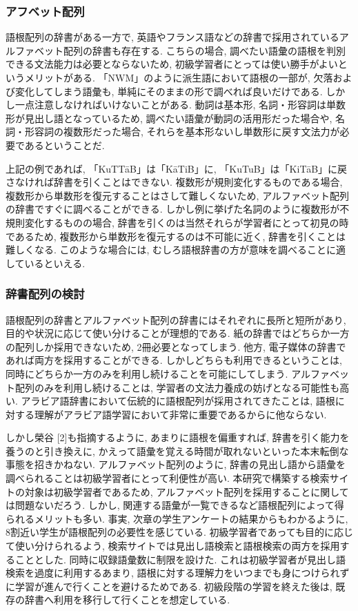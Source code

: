 \documentclass[technicalreport]{ieicej}
\begin{document}
\subsubsection{アフベット配列}
語根配列の辞書がある一方で, 英語やフランス語などの辞書で採用されているアルファベット配列の辞書も存在する. こちらの場合, 調べたい語彙の語根を判別できる文法能力は必要とならないため, 初級学習者にとっては使い勝手がよいというメリットがある. 「NWM」のように派生語において語根の一部が, 欠落および変化してしまう語彙も, 単純にそのままの形で調べれば良いだけである. しかし一点注意しなければいけないことがある. 動詞は基本形, 名詞・形容詞は単数形が見出し語となっているため, 調べたい語彙が動詞の活用形だった場合や, 名詞・形容詞の複数形だった場合, それらを基本形ないし単数形に戻す文法力が必要であるということだ. 

上記の例であれば, 「KuTTāB」は「KāTiB」に, 「KuTuB」は「KiTāB」に戻さなければ辞書を引くことはできない. 複数形が規則変化するものである場合, 複数形から単数形を復元することはさして難しくないため, アルファベット配列の辞書ですぐに調べることができる. しかし例に挙げた名詞のように複数形が不規則変化するものの場合, 辞書を引くのは当然それらが学習者にとって初見の時であるため, 複数形から単数形を復元するのは不可能に近く, 辞書を引くことは難しくなる. このような場合には, むしろ語根辞書の方が意味を調べることに適しているといえる. 

\subsubsection{辞書配列の検討}
語根配列の辞書とアルファベット配列の辞書にはそれぞれに長所と短所があり, 目的や状況に応じて使い分けることが理想的である. 紙の辞書ではどちらか一方の配列しか採用できないため, 2冊必要となってしまう. 他方, 電子媒体の辞書であれば両方を採用することができる. しかしどちらも利用できるということは, 同時にどちらか一方のみを利用し続けることを可能にしてしまう. アルファベット配列のみを利用し続けることは, 学習者の文法力養成の妨げとなる可能性も高い. アラビア語辞書において伝統的に語根配列が採用されてきたことは, 語根に対する理解がアラビア語学習において非常に重要であるからに他ならない. 

しかし榮谷 [2]も指摘するように, あまりに語根を偏重すれば, 辞書を引く能力を養うのと引き換えに, かえって語彙を覚える時間が取れないといった本末転倒な事態を招きかねない. アルファベット配列のように, 辞書の見出し語から語彙を調べられることは初級学習者にとって利便性が高い. 本研究で構築する検索サイトの対象は初級学習者であるため, アルファベット配列を採用することに関しては問題ないだろう. しかし, 関連する語彙が一覧できるなど語根配列によって得られるメリットも多い. 事実, 次章の学生アンケートの結果からもわかるように, 8割近い学生が語根配列の必要性を感じている. 初級学習者であっても目的に応じて使い分けられるよう, 検索サイトでは見出し語検索と語根検索の両方を採用することとした. 同時に収録語彙数に制限を設けた. これは初級学習者が見出し語検索を過度に利用するあまり, 語根に対する理解力をいつまでも身につけられずに学習が進んで行くことを避けるためである. 初級段階の学習を終えた後は, 既存の辞書へ利用を移行して行くことを想定している. 
\end{document}
